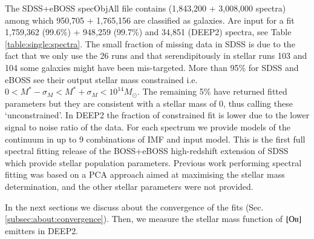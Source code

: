 \documentclass[onecolumn]{aa}
\newcommand{\OII}{$\left[\mathrm{O\textrm{\textsc{ii}}}\right]$\xspace}
\begin{document}





The SDSS+eBOSS specObjAll file contains (1,843,200 + 3,008,000 spectra) among which 950,705 + 1,765,156 are classified as galaxies. Are input for a fit 1,759,362 (99.6\%) + 948,259 (99.7\%) and 34,851 (DEEP2) spectra, see Table \ref{table:single:spectra}. The small fraction of missing data in SDSS is due to the fact that we only use the 26 runs and that serendipitously in stellar runs 103 and 104 some galaxies might have been mis-targeted. More than 95\% for SDSS and eBOSS see their output stellar mass constrained i.e. $0<M^*-\sigma_M<M^*+\sigma_M<10^{14} M_\odot$. The remaining 5\% have returned fitted parameters but they are consistent with a stellar mass of 0, thus calling these `unconstrained'. In DEEP2 the fraction of constrained fit is lower due to the lower signal to noise ratio of the data.
For each spectrum we provide models of the continuum in up to 9 combinations of IMF and input model. 
This is the first full spectral fitting release of the BOSS+eBOSS high-redshift extension of SDSS which provide stellar population parameters. 
Previous work performing spectral fitting was based on a PCA approach \citep{2012MNRAS.421..314C} aimed at maximising the stellar mass determination, and the other stellar parameters were not provided.

In the next sections we discuss about the convergence of the fits (Sec. \ref{subsec:about:convergence}). 
Then, we measure the stellar mass function of \OII emitters in DEEP2.
\end{document}
